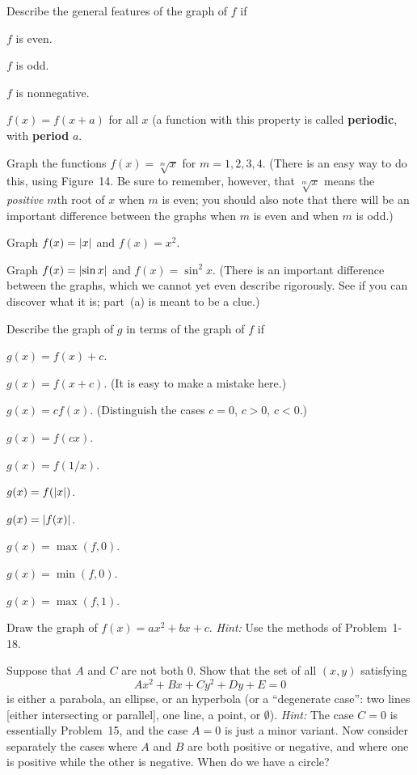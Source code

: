  Describe the general features of the graph of $f$ if
\begin{romans}
\item $f$ is even.
\item $f$ is odd.
\item $f$ is nonnegative.
\item $f(x)=f(x+a)$ for all $x$ (a function with this property is called
  \textbf{periodic}, with \textbf{period} $a$.
\end{romans}

 Graph the functions $f(x)=\sqrt[m]{x}$ for $m=1,2,3,4$. (There is an
easy way to do this, using Figure~14. Be sure to remember, however, that
$\sqrt[m]{x}$ means the \emph{positive} $m$th root of $x$ when $m$ is even; you
should also note that there will be an important difference between the graphs
when $m$ is even and when $m$ is odd.)

\begin{letters}
\item Graph $f(x)=\lvert x\rvert$ and $f(x)=x^2$.
\item Graph $f(x)=\lvert\sin x\rvert$ and $f(x)=\sin^2 x$. (There is an important
  difference between the graphs, which we cannot yet even describe rigorously.
  See if you can discover what it is; part~(a) is meant to be a clue.)
\end{letters}

 Describe the graph of $g$ in terms of the graph of $f$ if
\begin{romans}
\item $g(x)=f(x)+c$.
\item $g(x)=f(x+c)$. (It is easy to make a mistake here.)
\item $g(x)=cf(x)$. (Distinguish the cases $c=0$, $c>0$, $c<0$.)
\item $g(x)=f(cx)$.
\item $g(x)=f(1/x)$.
\item $g(x)=f(\lvert x\rvert)$.
\item $g(x)=\lvert f(x)\rvert$.
\item $g(x)=\max(f,0)$.
\item $g(x)=\min(f,0)$.
\item $g(x)=\max(f,1)$.
\end{romans}

 Draw the graph of $f(x)=ax^2+bx+c$. \textit{Hint:} Use the methods
of Problem~1-18.

 Suppose that $A$ and $C$ are not both $0$. Show that the set of all
$(x,y)$ satisfying
\[
Ax^2+Bx+Cy^2+Dy+E=0
\]
is either a parabola, an ellipse, or an hyperbola (or a ``degenerate case'':
two lines [either intersecting or parallel], one line, a point, or
$\emptyset$). \textit{Hint:} The case $C=0$ is essentially Problem~15, and the
case $A=0$ is just a minor variant. Now consider separately the cases where
$A$ and $B$ are both positive or negative, and where one is positive while the
other is negative. When do we have a circle?

